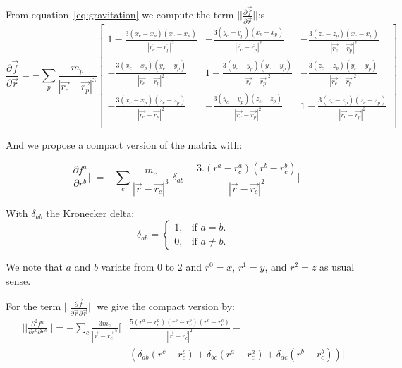  From equation~\ref{eq:gravitation} we compute the term $||\frac{\partial\vec{f}}{\partial\vec{r}}||$:s
 \begin{equation}
\frac{\partial\vec{f}}{\partial\vec{r}} =
- \sum_p \frac{m_p}{|\vec{r_c}-\vec{r_p}|^3}
\begin{bmatrix}
1 - \frac{3(x_c-x_p)(x_c-x_p)}{|\overline{r_c}-\overline{r_p}|^2} & -\frac{3(y_c-y_p)(x_c-x_p)}{|\overline{r_c}-\overline{r_p}|^2}  & -\frac{3(z_c-z_p)(x_c-x_p)}{|\vec{r_c}-\vec{r_p}|^2}  \\
-\frac{3(x_c-x_p)(y_c-y_p)}{|\vec{r_c}-\vec{r_p}|^2}  & 1 - \frac{3(y_c-y_p)(y_c-y_p)}{|\vec{r_c}-\vec{r_p}|^2} &  -\frac{3(z_c-z_p)(y_c-y_p)}{|\vec{r_c}-\vec{r_p}|^2}\\
- \frac{3(x_c-x_p)(z_c-z_p)}{|\vec{r_c}-\vec{r_p}|^2}   &  -\frac{3(y_c-y_p)(z_c-z_p)}{|\vec{r_c}-\vec{r_p}|^2} &  1- \frac{3(z_c-z_p)(z_c-z_p)}{|\vec{r_c}-\vec{r_p}|^2} \\
\end{bmatrix}
 \end{equation}

And we propose a compact version of the matrix with: 
 
\begin{equation}
 ||\frac{\partial f^a}{\partial r^b}|| = -\sum_c \frac{m_c}{|\vec{r}-\vec{r_c}|^3} \Big[ \delta_{ab} - \frac{3.(r^a-r_c^a)(r^b-r_c^b)}{|\vec{r}-\vec{r_c}|^2} \Big] 
\end{equation}

With $\delta_{ab}$ the Kronecker delta:
\begin{equation}
\delta_{ab} = 
\begin{cases}
    1, & \text{if $a = b$}.\\
    0, & \text{if $a\neq b$}.
  \end{cases}
\end{equation}

We note that $a$ and $b$ variate from 0 to 2 and $r^0=x$, $r^1=y$, and $r^2=z$ as usual sense. 

For the term $||\frac{\partial\vec{f}}{\partial\vec{r} \partial\vec{r}}||$ we give the compact version by:
\begin{equation}
\begin{aligned}
||\frac{\partial^2 f^a}{\partial r^b \partial r^c}|| = - \sum_c \frac{3 m_c}{|\vec{r}-\vec{r_c}|^5} \Big[ & \frac{5(r^a-r_c^a)(r^b-r_c^b)(r^c-r_c^c)}{|\vec{r}-\vec{r_c}|^2} - \\ 
		 & \left( \delta_{ab} (r^c-r_c^c)+\delta_{bc} (r^a-r_c^a)+\delta_{ac} (r^b-r_c^b) \right) \Big] 
\end{aligned}
\end{equation} 

